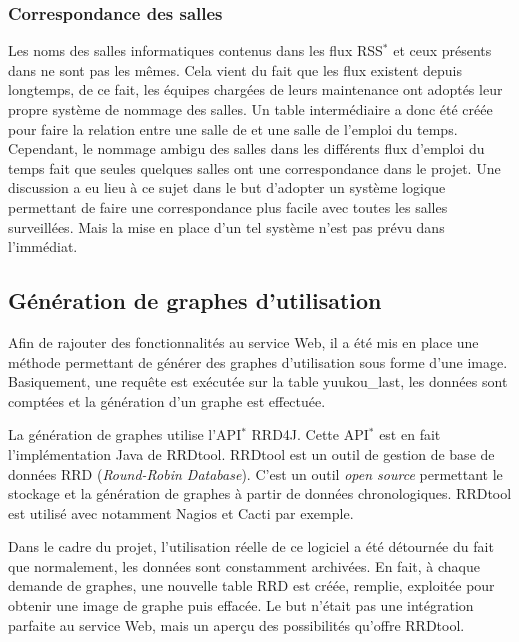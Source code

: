 \subsubsection{Correspondance des salles}

Les noms des salles informatiques contenus dans les flux RSS$^*$ et ceux pr\'esents dans {\YuukouII} ne sont pas les m\^emes.
Cela vient du fait que les flux existent depuis longtemps, de ce fait, les \'equipes charg\'ees de leurs maintenance ont adopt\'es leur propre syst\`eme de nommage des salles.
Un table interm\'ediaire a donc \'et\'e cr\'e\'ee pour faire la relation entre une salle de {\YuukouII} et une salle de l'emploi du temps.
Cependant, le nommage ambigu des salles dans les diff\'erents flux d'emploi du temps fait que seules quelques salles ont une correspondance dans le projet.
Une discussion a eu lieu \`a ce sujet dans le but d'adopter un syst\`eme logique permettant de faire une correspondance plus facile avec toutes les salles surveill\'ees.
Mais la mise en place d'un tel syst\`eme n'est pas pr\'evu dans l'imm\'ediat.

\subsection{G\'en\'eration de graphes d'utilisation}

Afin de rajouter des fonctionnalit\'es au service Web, il a \'et\'e mis en place une m\'ethode permettant de g\'en\'erer des graphes d'utilisation sous forme d'une image.
Basiquement, une requ\^ete est ex\'ecut\'ee sur la table \textsf{yuukou\_last}, les donn\'ees sont compt\'ees et la g\'en\'eration d'un graphe est effectu\'ee.

La g\'en\'eration de graphes utilise l'API$^*$ RRD4J.
Cette API$^*$ est en fait l'impl\'ementation Java de RRDtool.
RRDtool est un outil de gestion de base de donn\'ees RRD (\textit{Round-Robin Database}).
C'est un outil \textit{open source} permettant le stockage et la g\'en\'eration de graphes \`a partir de donn\'ees chronologiques.
RRDtool est utilis\'e avec notamment Nagios et Cacti par exemple.

Dans le cadre du projet, l'utilisation r\'eelle de ce logiciel a \'et\'e d\'etourn\'ee du fait que normalement, les donn\'ees sont constamment archiv\'ees.
En fait, \`a chaque demande de graphes, une nouvelle table RRD est cr\'e\'ee, remplie, exploit\'ee pour obtenir une image de graphe puis effac\'ee.
Le but n'\'etait pas une int\'egration parfaite au service Web, mais un aper\c{c}u des possibilit\'es qu'offre RRDtool.

